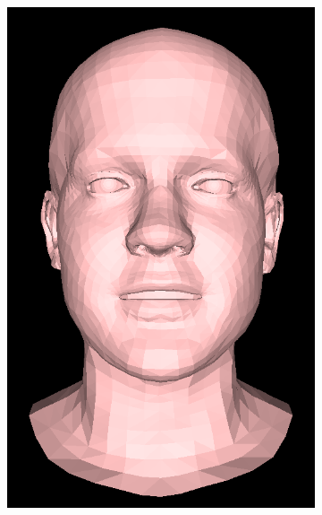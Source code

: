 \begin{figure}[h!]
\begin{subfigure}[b]{0.19\textwidth}
        \includegraphics[width=\textwidth]{figures/gen_sample/00007.png}
    \end{subfigure}
    \begin{subfigure}[b]{0.19\textwidth}

\end{subfigure}
\end{figure}

